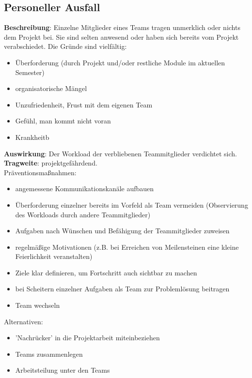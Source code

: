 \documentclass[a4paper, 12pt, titlepage]{scrartcl}
\begin{document}
	\subsection{Personeller Ausfall}
		\textbf{Beschreibung}: Einzelne Mitglieder eines Teams tragen unmerklich oder nichts dem Projekt bei. Sie sind selten anwesend oder haben sich bereits vom Projekt verabschiedet. Die Gr\"unde sind vielf\"altig:
			\begin{itemize}
				\item \"Uberforderung (durch Projekt und/oder restliche Module im aktuellen Semester)
				\item organisatorische M\"angel
				\item Unzufriedenheit, Frust mit dem eigenen Team
				\item Gef\"uhl, man kommt nicht voran
				\item Krankheitb
			\end{itemize}
		\textbf{Auswirkung}: Der Workload der verbliebenen Teammitglieder verdichtet sich. \\
		\textbf{Tragweite}: projektgef\"ahrdend.\\
		Pr\"aventionsma\ss nahmen:
			\begin{itemize}
				\item angemessene Kommunikationskan\"ale aufbauen
				\item \"Uberforderung einzelner bereits im Vorfeld als Team vermeiden (Observierung des Workloads durch andere Teammitglieder)
				\item Aufgaben nach W\"unschen und Bef\"ahigung der Teammitglieder zuweisen
				\item regelm\"a\ss ige Motivationen (z.B. bei Erreichen von Meilensteinen eine kleine Feierlichkeit veranstalten)
				\item Ziele klar definieren, um Fortschritt auch sichtbar zu machen
				\item bei Scheitern einzelner Aufgaben als Team zur Probleml\"osung beitragen
				\item Team wechseln
			\end{itemize}
		Alternativen:
			\begin{itemize}
				\item 'Nachr\"ucker' in die Projektarbeit miteinbeziehen
				\item Teams zusammenlegen
				\item Arbeitsteilung unter den Teams
			\end{itemize} 
		
\end{document}
